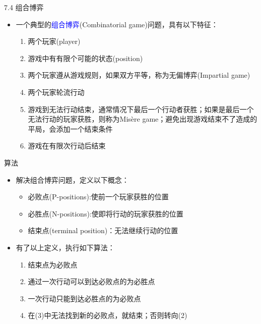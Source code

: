 \begin{frame}{7.4 组合博弈}
    \begin{itemize}
        \item 一个典型的\textcolor{blue}{组合博弈}(Combinatorial game)问题，具有以下特征：
        \begin{enumerate}[(1)]
            \item 两个玩家(player)
            \item 游戏中有有限个可能的状态(position)
            \item 两个玩家遵从游戏规则，如果双方平等，称为无偏博弈(Impartial game)
            \item 两个玩家轮流行动
            \item 游戏到无法行动结束，通常情况下最后一个行动者获胜；如果是最后一个无法行动的玩家获胜，则称为Misère game；避免出现游戏结束不了造成的平局，会添加一个结束条件
            \item 游戏在有限次行动后结束
        \end{enumerate}
    \end{itemize}
\end{frame}
\begin{frame}{算法}
    \begin{itemize}
        \item 解决组合博弈问题，定义以下概念：
        \begin{itemize}
            \item 必败点(P-positions):使前一个玩家获胜的位置
            \item 必胜点(N-positions):使即将行动的玩家获胜的位置
            \item 结束点(terminal position)：无法继续行动的位置
        \end{itemize}
        \item 有了以上定义，执行如下算法：
        \begin{enumerate}[(1)]
            \item 结束点为必败点
            \item 通过一次行动可以到达必败点的为必胜点
            \item 一次行动只能到达必胜点的为必败点
            \item 在(3)中无法找到新的必败点，就结束；否则转向(2)
        \end{enumerate}
    \end{itemize}
\end{frame}
